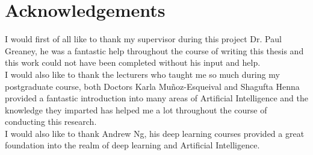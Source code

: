\chapter*{Acknowledgements}
I would first of all like to thank my supervisor during this project Dr. Paul Greaney, he was a fantastic help throughout the course of writing this thesis and this work could not have been completed without his input and help.
\\[1.5cm]
I would also like to thank the lecturers who taught me so much during my postgraduate course, both Doctors Karla Muñoz-Esqueival and Shagufta Henna provided a fantastic introduction into many areas of Artificial Intelligence and the knowledge they imparted has helped me a lot throughout the course of conducting this research. 
\\[1.5cm]
I would also like to thank Andrew Ng, his deep learning courses provided a great foundation into the realm of deep learning and Artificial Intelligence.